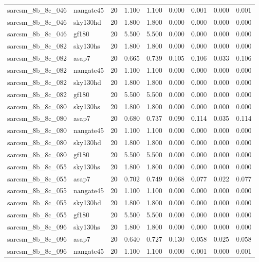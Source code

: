 \begin{tabular}{llrrrrrrr}
sarcsm\_8b\_8c\_046 & nangate45 & 20 & 1.100 & 1.100 & 0.000 & 0.001 & 0.000 & 0.001 \\
sarcsm\_8b\_8c\_046 & sky130hd & 20 & 1.800 & 1.800 & 0.000 & 0.000 & 0.000 & 0.000 \\
sarcsm\_8b\_8c\_046 & gf180 & 20 & 5.500 & 5.500 & 0.000 & 0.000 & 0.000 & 0.000 \\
sarcsm\_8b\_8c\_082 & sky130hs & 20 & 1.800 & 1.800 & 0.000 & 0.000 & 0.000 & 0.000 \\
sarcsm\_8b\_8c\_082 & asap7 & 20 & 0.665 & 0.739 & 0.105 & 0.106 & 0.033 & 0.106 \\
sarcsm\_8b\_8c\_082 & nangate45 & 20 & 1.100 & 1.100 & 0.000 & 0.000 & 0.000 & 0.000 \\
sarcsm\_8b\_8c\_082 & sky130hd & 20 & 1.800 & 1.800 & 0.000 & 0.000 & 0.000 & 0.000 \\
sarcsm\_8b\_8c\_082 & gf180 & 20 & 5.500 & 5.500 & 0.000 & 0.000 & 0.000 & 0.000 \\
sarcsm\_8b\_8c\_080 & sky130hs & 20 & 1.800 & 1.800 & 0.000 & 0.000 & 0.000 & 0.000 \\
sarcsm\_8b\_8c\_080 & asap7 & 20 & 0.680 & 0.737 & 0.090 & 0.114 & 0.035 & 0.114 \\
sarcsm\_8b\_8c\_080 & nangate45 & 20 & 1.100 & 1.100 & 0.000 & 0.000 & 0.000 & 0.000 \\
sarcsm\_8b\_8c\_080 & sky130hd & 20 & 1.800 & 1.800 & 0.000 & 0.000 & 0.000 & 0.000 \\
sarcsm\_8b\_8c\_080 & gf180 & 20 & 5.500 & 5.500 & 0.000 & 0.000 & 0.000 & 0.000 \\
sarcsm\_8b\_8c\_055 & sky130hs & 20 & 1.800 & 1.800 & 0.000 & 0.000 & 0.000 & 0.000 \\
sarcsm\_8b\_8c\_055 & asap7 & 20 & 0.702 & 0.749 & 0.068 & 0.077 & 0.022 & 0.077 \\
sarcsm\_8b\_8c\_055 & nangate45 & 20 & 1.100 & 1.100 & 0.000 & 0.000 & 0.000 & 0.000 \\
sarcsm\_8b\_8c\_055 & sky130hd & 20 & 1.800 & 1.800 & 0.000 & 0.000 & 0.000 & 0.000 \\
sarcsm\_8b\_8c\_055 & gf180 & 20 & 5.500 & 5.500 & 0.000 & 0.000 & 0.000 & 0.000 \\
sarcsm\_8b\_8c\_096 & sky130hs & 20 & 1.800 & 1.800 & 0.000 & 0.000 & 0.000 & 0.000 \\
sarcsm\_8b\_8c\_096 & asap7 & 20 & 0.640 & 0.727 & 0.130 & 0.058 & 0.025 & 0.058 \\
sarcsm\_8b\_8c\_096 & nangate45 & 20 & 1.100 & 1.100 & 0.000 & 0.001 & 0.000 & 0.001 \\

\end{tabular}
